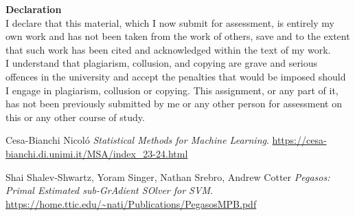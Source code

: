 \documentclass[a4paper]{article}
\begin{document}
\clearpage\null\newpage

\vspace*{1cm}

\textbf{Declaration}\\
I declare that this material, which I now submit for assessment, is entirely my own work and has not been taken from the work of others, save and to the extent that such work has been cited and acknowledged within the text of my work.\\
I understand that plagiarism, collusion, and copying are grave and serious offences in the university and accept the penalties that would be imposed should I engage in plagiarism, collusion or copying. This assignment, or any part of it, has not been previously submitted by me or any other person for assessment on this or any other course of study.\\
        

\newpage
\tableofcontents
\setlength{\parindent}{0pt}
\setlength{\parskip}{0.8em}


\clearpage\null\newpage


\newpage







\newpage

\begin{thebibliography}{unsrt}

    Cesa-Bianchi Nicoló \emph{Statistical Methods for Machine Learning}. 
    \url{https://cesa-bianchi.di.unimi.it/MSA/index_23-24.html}
    
    Shai Shalev-Shwartz, Yoram Singer, Nathan Srebro, Andrew Cotter \emph{Pegasos: Primal Estimated sub-GrAdient SOlver for SVM}. 
    \url{https://home.ttic.edu/~nati/Publications/PegasosMPB.pdf}
    
    
\end{thebibliography}
\end{document}
